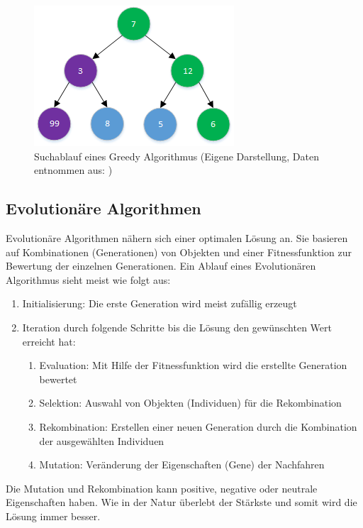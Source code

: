 \begin{figure}[h]
\centering 
\includegraphics[scale=1]{images/einleitung/greedy_algo.png}
\caption[Suchablauf eines Greedy Algorithmus]{Suchablauf eines Greedy Algorithmus (Eigene Darstellung, Daten entnommen aus: \cite{pic_greedy_algo})}
\label{fig:greedy_algo}
\end{figure}

\FloatBarrier

\subsection{Evolutionäre Algorithmen}\label{ea_algos}
Evolutionäre Algorithmen nähern sich einer optimalen Lösung an. Sie basieren auf Kombinationen (Generationen) von Objekten und einer Fitnessfunktion zur Bewertung der einzelnen Generationen. Ein Ablauf eines Evolutionären Algorithmus sieht meist wie folgt aus:
\begin{enumerate}
	\item Initialisierung: Die erste Generation wird meist zufällig erzeugt
	\item Iteration durch folgende Schritte bis die Lösung den gewünschten Wert erreicht hat:
     	\begin{enumerate}
		\item Evaluation: Mit Hilfe der Fitnessfunktion wird die erstellte Generation bewertet
         		\item Selektion: Auswahl von Objekten (Individuen) für die Rekombination
         		\item Rekombination: Erstellen einer neuen Generation durch die Kombination der ausgewählten Individuen
         		\item Mutation: Veränderung der Eigenschaften (Gene) der Nachfahren
      	\end{enumerate}
\end{enumerate}
Die Mutation und Rekombination kann positive, negative oder neutrale Eigenschaften haben. Wie in der Natur überlebt der Stärkste und somit wird die Lösung immer besser.
